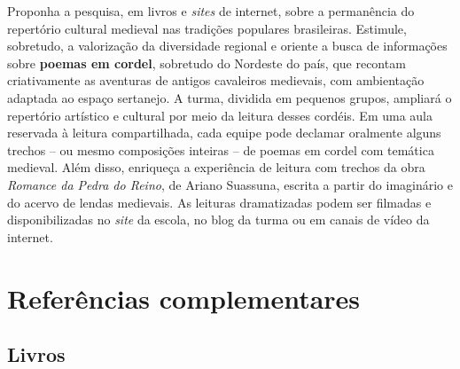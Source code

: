 \documentclass{extarticle}
\begin{document}
  Proponha a pesquisa, em livros e \emph{sites} de internet, sobre a
  permanência do repertório cultural medieval nas tradições populares
  brasileiras. Estimule, sobretudo, a valorização da diversidade
  regional e oriente a busca de informações sobre \textbf{poemas em
  cordel}, sobretudo do Nordeste do país, que recontam criativamente as
  aventuras de antigos cavaleiros medievais, com ambientação adaptada ao
  espaço sertanejo. A turma, dividida em pequenos grupos, ampliará o
  repertório artístico e cultural por meio da leitura desses cordéis. Em
  uma aula reservada à leitura compartilhada, cada equipe pode declamar
  oralmente alguns trechos -- ou mesmo composições inteiras -- de poemas
  em cordel com temática medieval. Além disso, enriqueça a experiência
  de leitura com trechos da obra \emph{Romance da Pedra do Reino}, de
  Ariano Suassuna, escrita a partir do imaginário e do acervo de lendas
  medievais. As leituras dramatizadas podem ser filmadas e
  disponibilizadas no \emph{site} da escola, no blog da turma ou em
  canais de vídeo da internet.

\section{Referências complementares}

\subsection{Livros}
\end{document}
